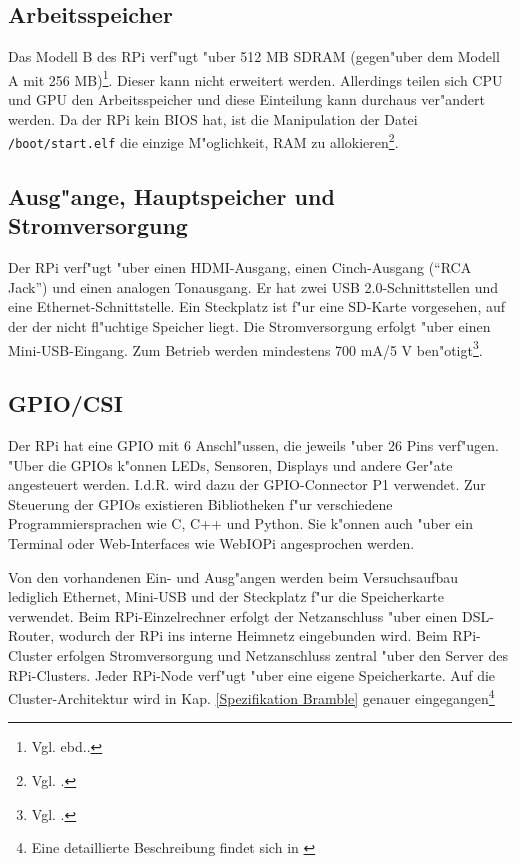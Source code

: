 \subsection{Arbeitsspeicher}\label{RPi RAM}
Das Modell B des RPi verf"ugt "uber 512 MB SDRAM (gegen"uber dem Modell A mit 256 MB)\footnote{Vgl. ebd..}. Dieser kann nicht erweitert werden. Allerdings teilen sich CPU und GPU den Arbeitsspeicher und diese Einteilung kann durchaus ver"andert werden. Da der RPi kein BIOS hat, ist die Manipulation der Datei \verb+/boot/start.elf+ die einzige M"oglichkeit, RAM zu allokieren\footnote{Vgl. \cite{pow12}.}.

\subsection{Ausg"ange, Hauptspeicher und Stromversorgung}\label{RPi Schnittstellen}

Der RPi verf"ugt "uber einen HDMI-Ausgang, einen Cinch-Ausgang ("`RCA Jack"') und einen analogen Tonausgang. Er hat zwei USB 2.0-Schnittstellen und eine Ethernet-Schnittstelle. Ein Steckplatz ist f"ur eine SD-Karte vorgesehen, auf der der nicht fl"uchtige Speicher liegt. Die Stromversorgung erfolgt "uber einen Mini-USB-Eingang. Zum Betrieb werden mindestens 700 mA/5 V ben"otigt\footnote{Vgl. \cite{pow12}.}. 

\subsection{GPIO/CSI}\label{RPi GPIO} 

Der RPi hat eine GPIO mit 6 Anschl"ussen, die jeweils "uber 26 Pins verf"ugen. "Uber die GPIOs k"onnen LEDs, Sensoren, Displays und andere Ger"ate angesteuert werden. I.d.R. wird dazu der GPIO-Connector P1 verwendet. Zur Steuerung der GPIOs existieren Bibliotheken f"ur verschiedene Programmiersprachen wie C, C++ und Python. Sie k"onnen auch "uber ein Terminal oder Web-Interfaces wie WebIOPi angesprochen werden. 

Von den vorhandenen Ein- und Ausg"angen werden beim Versuchsaufbau lediglich Ethernet, Mini-USB und der Steckplatz f"ur die Speicherkarte verwendet. Beim RPi-Einzelrechner erfolgt der Netzanschluss "uber einen DSL-Router, wodurch der RPi ins interne Heimnetz eingebunden wird. Beim RPi-Cluster erfolgen Stromversorgung und Netzanschluss zentral "uber den Server des RPi-Clusters. Jeder RPi-Node verf"ugt "uber eine eigene Speicherkarte. Auf die Cluster-Architektur wird in Kap. \ref{Spezifikation Bramble} genauer eingegangen\footnote{Eine detaillierte Beschreibung findet sich in \cite{kli13}}

